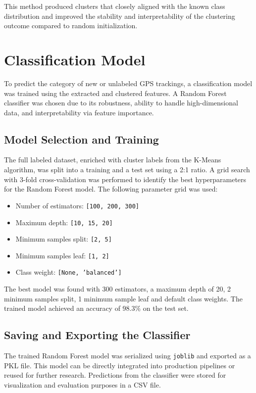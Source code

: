 \documentclass[a4paper,12pt,twoside]{scrreprt}
\begin{document}
This method produced clusters that closely aligned with the known class
distribution and improved the stability and interpretability of the clustering
outcome compared to random initialization.

\section{Classification Model}
To predict the category of new or unlabeled GPS trackings, a classification
model was trained using the extracted and clustered features. A Random Forest
classifier was chosen due to its robustness, ability to handle high-dimensional
data, and interpretability via feature importance.

\subsection{Model Selection and Training}

The full labeled dataset, enriched with cluster labels from the K-Means
algorithm, was split into a training and a test set using a 2:1 ratio. A grid
search with 3-fold cross-validation was performed to identify the best
hyperparameters for the Random Forest model. The following parameter grid was
used:

\begin{itemize}
  \item Number of estimators: \texttt{[100, 200, 300]}
  \item Maximum depth: \texttt{[10, 15, 20]}
  \item Minimum samples split: \texttt{[2, 5]}
  \item Minimum samples leaf: \texttt{[1, 2]}
  \item Class weight: \texttt{[None, 'balanced']}
\end{itemize}

The best model was found with 300 estimators, a maximum depth of 20,
2 minimum samples split, 1 minimum sample leaf and default
class weights. The trained model achieved an accuracy of
98.3\% on the test set.

\subsection{Saving and Exporting the Classifier}

The trained Random Forest model was serialized using \texttt{joblib} and
exported as a PKL file. This model can be directly
integrated into production pipelines or reused for further research.
Predictions from the classifier were stored for visualization and evaluation
purposes in a CSV file.
\end{document}
